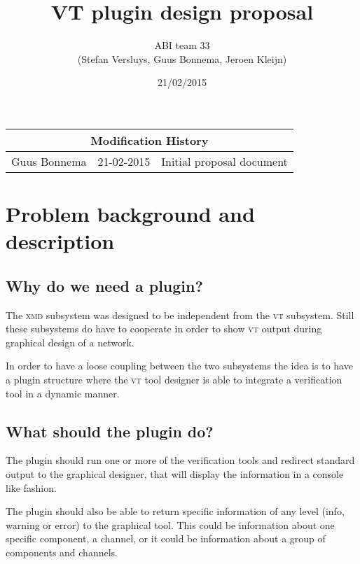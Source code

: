\documentclass[a4paper,11pt,final]{article}
\author{ABI team 33\\(Stefan Versluys, Guus Bonnema, Jeroen Kleijn)}
\date{21/02/2015}
\title{\color{blue}VT plugin design proposal}
\newcommand{\xmd}{\textsc{xmd}\xspace}%
\newcommand{\vt}{\textsc{vt}\xspace}%
\begin{document}

\maketitle


\begin{tabular}{|l|l|p{20em}|}
\hline 
\multicolumn{3}{|c|}{\bf Modification History}\\\hline
Guus Bonnema & 21-02-2015 & Initial proposal document \\\hline
\end{tabular} 


\maketitle

\tableofcontents

\section{Problem background and description}

\subsection{Why do we need a plugin?}

The \xmd subsystem was designed to be independent from the \vt subsystem. 
Still these subsystems do have to cooperate in order to show \vt output during 
graphical design of a network.

In order to have a loose coupling between the two subsystems the idea
is to have a plugin structure where the \vt tool designer is able to 
integrate a verification tool in a dynamic manner. 

\subsection{What should the plugin do?}

The plugin should run one or more of the verification tools and
redirect standard output to the graphical designer, that will
display the information in a console like fashion.

The plugin should also be able to return specific information
of any level (info, warning or error) to the graphical tool. This
could be information about one specific component, a channel, or it
could be information about a group of components and channels.
\end{document}
